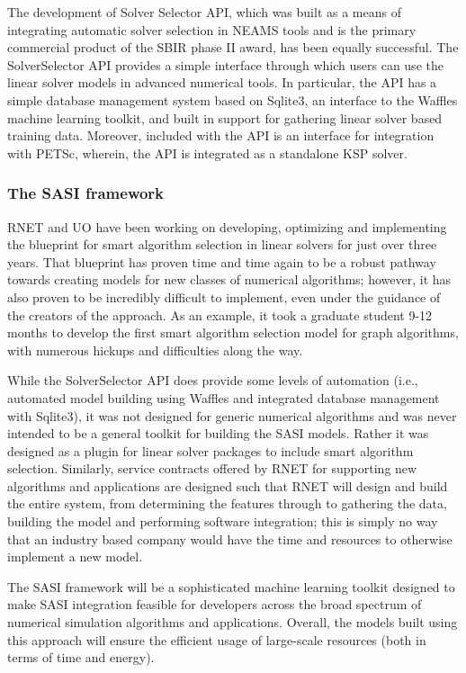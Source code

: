 The development of Solver Selector API, which was built as a means of integrating automatic solver selection in NEAMS tools and is the primary commercial product of the SBIR phase II award, has been equally successful. The SolverSelector API provides a simple interface through which users can use the linear solver models in advanced numerical tools. In particular, the API has a simple database management system based on Sqlite3, an interface to the Waffles machine learning toolkit, and built in support for gathering linear solver based training data. Moreover, included with the API is an interface for integration with PETSc, wherein, the API is integrated as a standalone KSP solver. 

\subsubsection{The SASI framework} 

RNET and UO have been working on developing, optimizing and implementing the blueprint for smart algorithm selection in linear solvers for just over three years. That blueprint has proven time and time again to be a robust pathway towards creating models for new classes of numerical algorithms; however, it has also proven to be incredibly difficult to implement, even under the guidance of the creators of the approach. As an example, it took a graduate student 9-12 months to develop the first smart algorithm selection model for graph algorithms, with numerous hickups and difficulties along the way. 

While the SolverSelector API does provide some levels of automation (i.e., automated model building using Waffles and integrated database management with Sqlite3), it was not designed for generic numerical algorithms and was never intended to be a general toolkit for building the SASI models. Rather it was designed as a plugin for linear solver packages to include smart algorithm selection. Similarly, service contracts offered by RNET for supporting new algorithms and applications are designed such that RNET will design and build the entire system, from determining the features through  to gathering the data, building the model and performing software integration; this is simply no way that an industry based company would have the time and resources to otherwise implement a new model. 

The SASI framework will be a sophisticated machine learning toolkit designed to make SASI integration feasible for developers across the broad spectrum of numerical simulation algorithms and applications. Overall, the models built using this approach will ensure the efficient usage of large-scale resources (both in terms of time and energy). 


